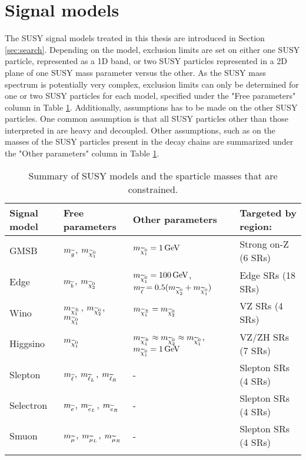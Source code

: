 \section{Signal models}
\noindent
\justify
The SUSY signal models treated in this thesis are introduced in Section \ref{sec:search}. 
Depending on the model, exclusion limits are set on either one SUSY particle, represented as a 1D band, or two SUSY particles represented in a 2D plane of one SUSY mass parameter versus the other.    
As the SUSY mass spectrum is potentially very complex, exclusion limits can only be determined for one or two SUSY particles for each model, specified under the "Free parameters" column in Table \ref{tab:signal}. 
Additionally, assumptions has to be made on the other SUSY particles.
One common assumption is that all SUSY particles other than those interpreted in are heavy and decoupled. 
Other assumptions, such as on the masses of the SUSY particles present in the decay chains are summarized under the "Other parameters" column in Table \ref{tab:signal}.  
\begin{table}[!hbtp]
\renewcommand{\arraystretch}{1.2}
\setlength{\belowcaptionskip}{6pt}
\small
\centering                             
\caption{Summary of SUSY models and the sparticle masses that are constrained.}
\begin{tabular}{l l l l}
\hline\hline
Signal model                         & Free parameters    & Other parameters & Targeted by region:    \\
\hline
GMSB                                 & $m_{\widetilde{g}}$, $m_{\widetilde{\chi}^{0}_{1}}$   & $m_{\widetilde{\chi}^{0}_{1}}=1\,\text{Ge\hspace{-.08em}V}$   & Strong on-Z (6 SRs)\\                          
Edge                                 & $m_{\widetilde{b}}$, $m_{\widetilde{\chi}^{0}_{2}}$  & $m_{\widetilde{\chi}^{0}_{1}}=100\,\text{Ge\hspace{-.08em}V}$, $m_{\widetilde{\ell}}=0.5(m_{\widetilde{\chi}^{0}_{2}}+m_{\widetilde{\chi}^{0}_{1}})$   & Edge SRs (18 SRs)\\                          
Wino                                 & $m_{\widetilde{\chi}^\pm_{1}}$, $m_{\widetilde{\chi}^{0}_{2}}$, $m_{\widetilde{\chi}^{0}_{1}}$  & $m_{\widetilde{\chi}^\pm_{1}}=m_{\widetilde{\chi}^{0}_{2}}$   & VZ SRs (4 SRs)\\                          
Higgsino                             & $m_{\widetilde{\chi}^{0}_{1}}$  & $m_{\widetilde{\chi}^\pm_{1}}\approx m_{\widetilde{\chi}^{0}_{2}}\approx m_{\widetilde{\chi}^{0}_{1}}$, $m_{\widetilde{\chi}^{0}_{1}}=1\,\text{Ge\hspace{-.08em}V}$   & VZ/ZH SRs (7 SRs)\\                          
Slepton                              & $m_{\widetilde{\ell}}$, $m_{\widetilde{\ell}_{L}}$, $m_{\widetilde{\ell}_{R}}$  & -   & Slepton SRs (4 SRs)\\                          
Selectron                            & $m_{\widetilde{e}}$, $m_{\widetilde{e}_{L}}$, $m_{\widetilde{e}_{R}}$  & -  & Slepton SRs (4 SRs)\\                          
Smuon                                & $m_{\widetilde{\mu}}$, $m_{\widetilde{\mu}_{L}}$, $m_{\widetilde{\mu}_{R}}$  & -   & Slepton SRs (4 SRs)\\                          
\hline\hline
\label{tab:signal}
\end{tabular}
\end{table}                                                                                                         
